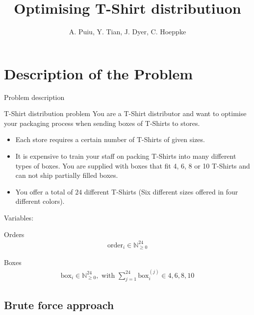 \documentclass{beamer}
\title[T-Shirt Problem]{Optimising T-Shirt distributiuon} %
\author{A. Puiu, Y. Tian, J. Dyer, C. Hoeppke} %
\institute[University of Oxford] %
{
\textit{Department for Mathematics} %
\date{\today} %
}
\newcommand{\N}{\mathbb{N}}
\begin{document}
\begin{frame}
\titlepage %
\end{frame}

\section{Description of the Problem}


\begin{frame}{Problem description}
    \begin{block}{T-Shirt distribution problem}
        You are a T-Shirt distributor and want to optimise your packaging
        process when sending boxes of T-Shirts to stores.
        \begin{itemize}
            \item Each store requires a
            certain number of T-Shirts of given sizes.
            \item It is expensive to train your staff on packing T-Shirts into many
            different types of boxes. You are supplied with boxes that fit 4, 6, 8
            or 10 T-Shirts and can not ship partially filled boxes.
            \item You offer a total of $24$ different T-Shirts (Six different sizes
            offered in four different colors).
        \end{itemize}
    \end{block}
    Variables:
    \begin{minipage}[h]{0.45\textwidth}
        Orders\\
        \begin{align*}
            \text{order}_i \in \N_{\geq 0}^{24}
        \end{align*}
    \end{minipage}
    \begin{minipage}[h]{0.45\textwidth}
        Boxes\\
        \begin{align*}
            \text{box}_i \in \N_{\geq 0}^{24}, \text{ with } \sum_{j = 1}^{24}
            \text{box}_i^{(j)} \in {4, 6, 8, 10}
        \end{align*}
    \end{minipage}
\end{frame}

\subsection{Brute force approach}

\end{document}
